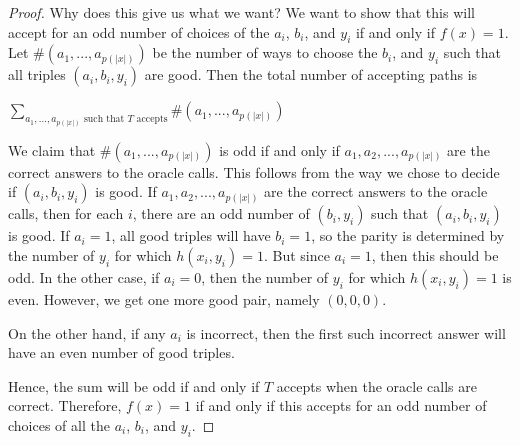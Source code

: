 \documentclass[11pt]{article}
\newcommand{\bp}{\textsf{BP}}
\newcommand{\parity}{\oplus}
\newcommand{\p}{\textsf{P}}
\newcommand{\pp}{\textsf{PP}}
\begin{document}
\begin{proof}
Why does this give us what we want? We want to show that this will accept for an odd number of choices of the $a_i$, $b_i$, and $y_i$ if and only if $f(x) = 1$. Let $\# (a_1,...,a_{p(|x|)})$ be the number of ways to choose the $b_i$, and $y_i$ such that all triples $(a_i,b_i,y_i)$ are good. Then the total number of accepting paths is
\begin{center}$\displaystyle \sum_{a_1,...,a_{p(|x|)}\text{ such that $T$ accepts}}  \#(a_1,...,a_{p(|x|)})$\end{center}
We claim that $ \#(a_1,...,a_{p(|x|)})$ is odd if and only if $a_1,a_2,...,a_{p(|x|)}$ are the correct answers to the oracle calls. This follows from the way we chose to decide if $(a_i, b_i, y_i)$ is good. If $a_1,a_2,...,a_{p(|x|)}$ are the correct answers to the oracle calls, then for each $i$, there are an odd number of $(b_i,y_i)$ such that $(a_i, b_i, y_i)$ is good. If $a_i = 1$, all good triples will have $b_i = 1$, so the parity is determined by the number of $y_i$ for which $h(x_i, y_i)=1$. But since $a_i = 1$, then this should be odd. In the other case, if $a_i = 0$, then the number of $y_i$ for which $h(x_i, y_i)=1$ is even. However, we get one more good pair, namely $(0,0,0)$.

On the other hand, if any $a_i$ is incorrect, then the first such incorrect answer will have an even number of good triples.

Hence, the sum will be odd if and only if $T$ accepts when the oracle calls are correct. Therefore, $f(x) = 1$ if and only if this accepts for an odd number of choices of all the $a_i$, $b_i$, and $y_i$.
\end{proof}
\end{document}
